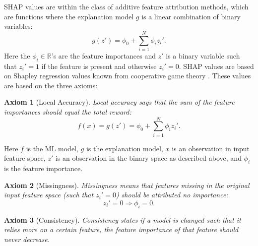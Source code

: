 \documentclass[a4paper, twoside, nobib]{tufte-book}
\newtheorem{axiom}{Axiom}
\newcommand{\autocite}[1]{\citep{#1}}
\begin{document}
SHAP values are within the class of additive feature attribution methods, which are functions where the explanation model $g$ is a linear combination of binary variables:
\begin{equation}
  \label{eq:ml:additive_feature_attribution_method}
  g(z') = \phi_0 + \sum_{i=1}^N \phi_i z_i'.
\end{equation}
Here the $\phi_i \in \mathbb{R}$'s are the feature importances and $z'$ is a binary variable such that $z_i'=1$ if the feature is present and otherwise $z_i' = 0$. SHAP values are based on Shapley regression values known from cooperative game theory \autocite{Shapley1953}. These values are based on the three axioms:
\begin{axiom}[Local Accuracy]
  Local accuracy says that the sum of the feature importances should equal the total reward:
  \begin{equation}
    f(x) = g(z') = \phi_0 + \sum_{i=1}^N \phi_i z_i'.
  \end{equation}
\end{axiom}
Here $f$ is the ML model, $g$ is the explanation model, $x$ is an observation in input feature space, $z'$ is an observation in the binary space as described above, and $\phi_i$ is the feature importance. 
\begin{axiom}[Missingness]
  Missingness means that features missing in the original input feature space (such that $z_i'=0$) should be attributed no importance:
  \begin{equation}
    z_i' = 0 \Rightarrow \phi_i = 0.
  \end{equation} 
\end{axiom}
\begin{axiom}[Consistency]
  \label{axiom:ml:shap_consistency}
  Consistency states if a model is changed such that it relies more on a certain feature, the feature importance of that feature should never decrease. 
\end{axiom}
\end{document}
